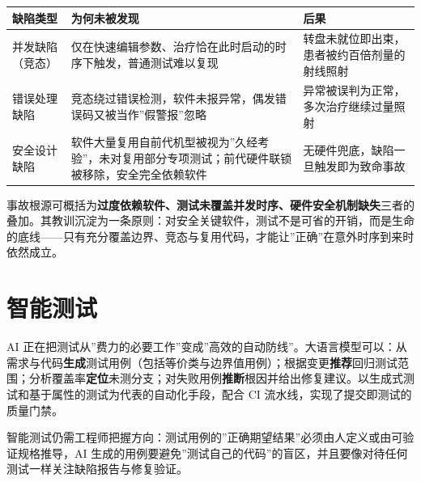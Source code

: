 \documentclass[12pt,a4paper,twoside,openany]{ctexbook}
\numberwithin{figure}{chapter}
\numberwithin{table}{chapter}
\newcounter{none}
\begin{document}
{\def\LTcaptype{none} %
\begin{longtable}[]{@{}
  >{\raggedright\arraybackslash}p{}
  >{\raggedright\arraybackslash}p{}
  >{\raggedright\arraybackslash}p{}@{}}
\toprule\noalign{}
\begin{minipage}[b]{\linewidth}\raggedright
缺陷类型
\end{minipage} & \begin{minipage}[b]{\linewidth}\raggedright
为何未被发现
\end{minipage} & \begin{minipage}[b]{\linewidth}\raggedright
后果
\end{minipage} \\
\midrule\noalign{}
\endhead
\bottomrule\noalign{}
\endlastfoot
并发缺陷（竞态） &
仅在快速编辑参数、治疗恰在此时启动的时序下触发，普通测试难以复现 &
转盘未就位即出束，患者被约百倍剂量的射线照射 \\
错误处理缺陷 &
竞态绕过错误检测，软件未报异常，偶发错误码又被当作''假警报''忽略 &
异常被误判为正常，多次治疗继续过量照射 \\
安全设计缺陷 &
软件大量复用自前代机型被视为''久经考验''，未对复用部分专项测试；前代硬件联锁被移除，安全完全依赖软件
& 无硬件兜底，缺陷一旦触发即为致命事故 \\
\end{longtable}
}

事故根源可概括为\textbf{过度依赖软件、测试未覆盖并发时序、硬件安全机制缺失}三者的叠加。其教训沉淀为一条原则：对安全关键软件，测试不是可省的开销，而是生命的底线------只有充分覆盖边界、竞态与复用代码，才能让''正确''在意外时序到来时依然成立。

\section{智能测试}\label{ux667aux80fdux6d4bux8bd5}

AI
正在把测试从''费力的必要工作''变成''高效的自动防线''。大语言模型可以：从需求与代码\textbf{生成}测试用例（包括等价类与边界值用例）；根据变更\textbf{推荐}回归测试范围；分析覆盖率\textbf{定位}未测分支；对失败用例\textbf{推断}根因并给出修复建议。以生成式测试和基于属性的测试为代表的自动化手段，配合
CI 流水线，实现了提交即测试的质量门禁。

智能测试仍需工程师把握方向：测试用例的''正确期望结果''必须由人定义或由可验证规格推导，AI
生成的用例要避免''测试自己的代码''的盲区，并且要像对待任何测试一样关注缺陷报告与修复验证。
\end{document}
